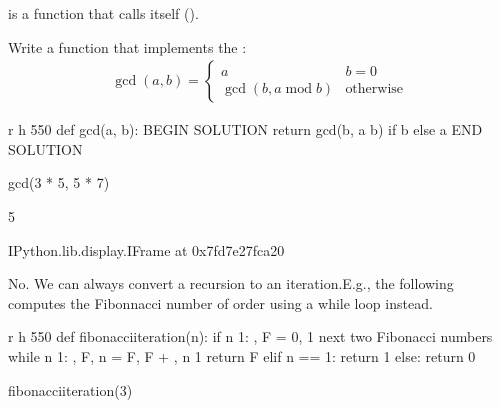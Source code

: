 \documentclass[letterpaper,10pt,english]{sphinxmanual}
\begin{document}
 is a function that calls itself ().

 Write a function  that implements the :
\begin{equation*}
\begin{split}\operatorname{gcd}(a,b)=\begin{cases}a & b=0\\ \operatorname{gcd}(b, a\operatorname{mod}b) & \text{otherwise} \end{cases}\end{split}
\end{equation*}
\begin{sphinxVerbatim}[commandchars=\\\{\}]
 \PYGZhy{}r \PYGZhy{}h 550
def gcd(a, b):
    \PYGZsh{}\PYGZsh{}\PYGZsh{} BEGIN SOLUTION
    return gcd(b, a \PYGZpc{} b) if b else a
    \PYGZsh{}\PYGZsh{}\PYGZsh{} END SOLUTION


gcd(3 * 5, 5 * 7)
\end{sphinxVerbatim}

\begin{sphinxVerbatim}[commandchars=\\\{\}]
5
\end{sphinxVerbatim}

\begin{sphinxVerbatim}[commandchars=\\\{\}]
\PYGZlt{}IPython.lib.display.IFrame at 0x7fd7e27fca20\PYGZgt{}
\end{sphinxVerbatim}


No. We can always convert a recursion to an iteration.E.g., the following computes the Fibonnacci number of order using a while loop instead.

\begin{sphinxVerbatim}[commandchars=\\\{\}]
 \PYGZhy{}r \PYGZhy{}h 550
def fibonacci\PYGZus{}iteration(n):
    if n \PYGZgt{} 1:
        \PYGZus{}, F = 0, 1  \PYGZsh{} next two Fibonacci numbers
        while n \PYGZgt{} 1:
            \PYGZus{}, F, n = F, F + \PYGZus{}, n \PYGZhy{} 1
        return F
    elif n == 1:
        return 1
    else:
        return 0
    
fibonacci\PYGZus{}iteration(3)
\end{sphinxVerbatim}
\end{document}
